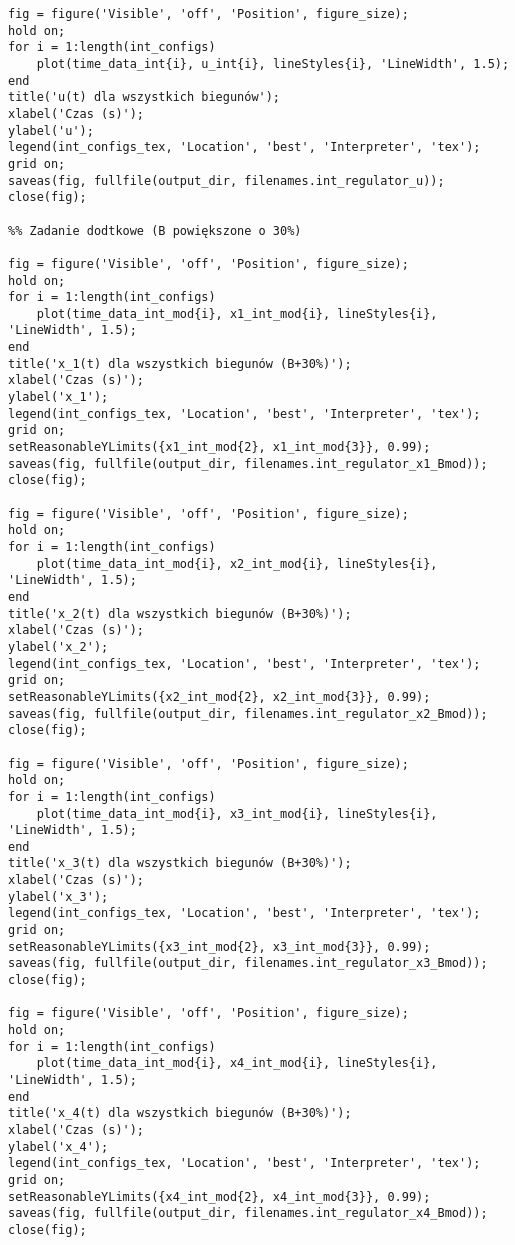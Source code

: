\documentclass[a4paper,titlepage,11pt,floatssmall]{mwrep} %
\begin{document}
\begin{lstlisting}[style=custommatlab, caption={Pełny kod skryptu \texttt{combined\_plots.m}.}, label={lst:init_full}]
fig = figure('Visible', 'off', 'Position', figure_size);
hold on;
for i = 1:length(int_configs)
    plot(time_data_int{i}, u_int{i}, lineStyles{i}, 'LineWidth', 1.5);
end
title('u(t) dla wszystkich biegunów');
xlabel('Czas (s)');
ylabel('u');
legend(int_configs_tex, 'Location', 'best', 'Interpreter', 'tex');
grid on;
saveas(fig, fullfile(output_dir, filenames.int_regulator_u));
close(fig);

%% Zadanie dodtkowe (B powiększone o 30%)

fig = figure('Visible', 'off', 'Position', figure_size);
hold on;
for i = 1:length(int_configs)
    plot(time_data_int_mod{i}, x1_int_mod{i}, lineStyles{i}, 'LineWidth', 1.5);
end
title('x_1(t) dla wszystkich biegunów (B+30%)');
xlabel('Czas (s)');
ylabel('x_1');
legend(int_configs_tex, 'Location', 'best', 'Interpreter', 'tex');
grid on;
setReasonableYLimits({x1_int_mod{2}, x1_int_mod{3}}, 0.99);
saveas(fig, fullfile(output_dir, filenames.int_regulator_x1_Bmod));
close(fig);

fig = figure('Visible', 'off', 'Position', figure_size);
hold on;
for i = 1:length(int_configs)
    plot(time_data_int_mod{i}, x2_int_mod{i}, lineStyles{i}, 'LineWidth', 1.5);
end
title('x_2(t) dla wszystkich biegunów (B+30%)');
xlabel('Czas (s)');
ylabel('x_2');
legend(int_configs_tex, 'Location', 'best', 'Interpreter', 'tex');
grid on;
setReasonableYLimits({x2_int_mod{2}, x2_int_mod{3}}, 0.99);
saveas(fig, fullfile(output_dir, filenames.int_regulator_x2_Bmod));
close(fig);

fig = figure('Visible', 'off', 'Position', figure_size);
hold on;
for i = 1:length(int_configs)
    plot(time_data_int_mod{i}, x3_int_mod{i}, lineStyles{i}, 'LineWidth', 1.5);
end
title('x_3(t) dla wszystkich biegunów (B+30%)');
xlabel('Czas (s)');
ylabel('x_3');
legend(int_configs_tex, 'Location', 'best', 'Interpreter', 'tex');
grid on;
setReasonableYLimits({x3_int_mod{2}, x3_int_mod{3}}, 0.99);
saveas(fig, fullfile(output_dir, filenames.int_regulator_x3_Bmod));
close(fig);

fig = figure('Visible', 'off', 'Position', figure_size);
hold on;
for i = 1:length(int_configs)
    plot(time_data_int_mod{i}, x4_int_mod{i}, lineStyles{i}, 'LineWidth', 1.5);
end
title('x_4(t) dla wszystkich biegunów (B+30%)');
xlabel('Czas (s)');
ylabel('x_4');
legend(int_configs_tex, 'Location', 'best', 'Interpreter', 'tex');
grid on;
setReasonableYLimits({x4_int_mod{2}, x4_int_mod{3}}, 0.99);
saveas(fig, fullfile(output_dir, filenames.int_regulator_x4_Bmod));
close(fig);


\end{lstlisting}
\end{document}
